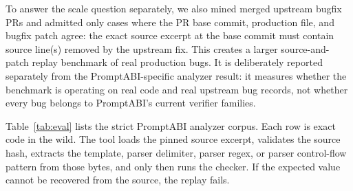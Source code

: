 \documentclass[10pt]{article}
\begin{document}
To answer the scale question separately, we also mined merged upstream bugfix
PRs and admitted only cases where the PR base commit, production file, and
bugfix patch agree: the exact source excerpt at the base commit must contain
source line(s) removed by the upstream fix. This creates a larger
source-and-patch replay benchmark of real production bugs. It is deliberately
reported separately from the PromptABI-specific analyzer result: it measures
whether the benchmark is operating on real code and real upstream bug records,
not whether every bug belongs to PromptABI's current verifier families.

Table~\ref{tab:eval} lists the strict PromptABI analyzer corpus. Each row is
exact code in the wild. The tool loads the pinned source excerpt, validates the
source hash, extracts the template, parser delimiter, parser regex, or parser
control-flow pattern from those bytes, and only then runs the checker. If the
expected value cannot be recovered from the source, the replay fails.
\end{document}

